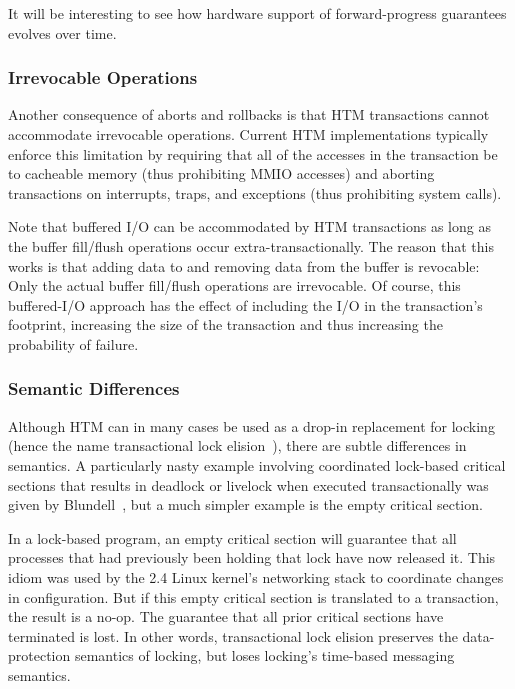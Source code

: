 It will be interesting to see how hardware support of forward-progress
guarantees evolves over time.

\subsubsection{Irrevocable Operations}
\label{sec:future:Irrevocable Operations}

Another consequence of aborts and rollbacks is that HTM transactions
cannot accommodate irrevocable operations.
Current HTM implementations typically enforce this limitation by
requiring that all of the accesses in the transaction be to cacheable
memory (thus prohibiting MMIO accesses) and aborting transactions on
interrupts, traps, and exceptions (thus prohibiting system calls).

Note that buffered I/O can be accommodated by HTM transactions as
long as the buffer fill/flush operations occur extra-transactionally.
The reason that this works is that adding data to and removing data
from the buffer is revocable: Only the actual buffer fill/flush
operations are irrevocable.
Of course, this buffered-I/O approach has the effect of including the I/O
in the transaction's footprint, increasing the size of the transaction
and thus increasing the probability of failure.

\subsubsection{Semantic Differences}
\label{sec:future:Semantic Differences}

Although HTM can in many cases be used as a drop-in replacement for locking
(hence the name transactional lock
elision~\cite{DaveDice2008TransactLockElision}),
there are subtle differences in semantics.
A particularly nasty example involving coordinated lock-based critical
sections that results in deadlock or livelock when executed transactionally
was given by Blundell~\cite{Blundell2006TMdeadlock}, but a much simpler
example is the empty critical section.

In a lock-based program, an empty critical section will guarantee
that all processes that had previously been holding that lock have
now released it.
This idiom was used by the 2.4 Linux kernel's networking stack to
coordinate changes in configuration.
But if this empty critical section is translated to a transaction,
the result is a no-op.
The guarantee that all prior critical sections have terminated is
lost.
In other words, transactional lock elision preserves the data-protection
semantics of locking, but loses locking's time-based messaging semantics.

